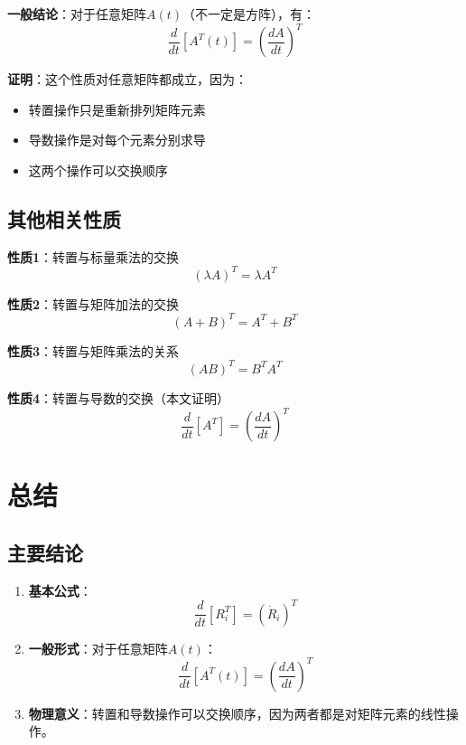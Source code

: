 \documentclass[12pt,a4paper]{article}
\begin{document}
\textbf{一般结论}：对于任意矩阵$A(t)$（不一定是方阵），有：
\begin{equation}
\frac{d}{dt}[A^T(t)] = \left(\frac{dA}{dt}\right)^T
\end{equation}

\textbf{证明}：这个性质对任意矩阵都成立，因为：
\begin{itemize}
\item 转置操作只是重新排列矩阵元素
\item 导数操作是对每个元素分别求导
\item 这两个操作可以交换顺序
\end{itemize}

\subsection{其他相关性质}

\textbf{性质1}：转置与标量乘法的交换
\begin{equation}
(\lambda A)^T = \lambda A^T
\end{equation}

\textbf{性质2}：转置与矩阵加法的交换
\begin{equation}
(A + B)^T = A^T + B^T
\end{equation}

\textbf{性质3}：转置与矩阵乘法的关系
\begin{equation}
(AB)^T = B^T A^T
\end{equation}

\textbf{性质4}：转置与导数的交换（本文证明）
\begin{equation}
\frac{d}{dt}[A^T] = \left(\frac{dA}{dt}\right)^T
\end{equation}

\section{总结}

\subsection{主要结论}

\begin{enumerate}
\item \textbf{基本公式}：
\begin{equation}
\frac{d}{dt}[R_i^T] = (\dot{R}_i)^T
\end{equation}

\item \textbf{一般形式}：对于任意矩阵$A(t)$：
\begin{equation}
\frac{d}{dt}[A^T(t)] = \left(\frac{dA}{dt}\right)^T
\end{equation}

\item \textbf{物理意义}：转置和导数操作可以交换顺序，因为两者都是对矩阵元素的线性操作。
\end{enumerate}
\end{document}

